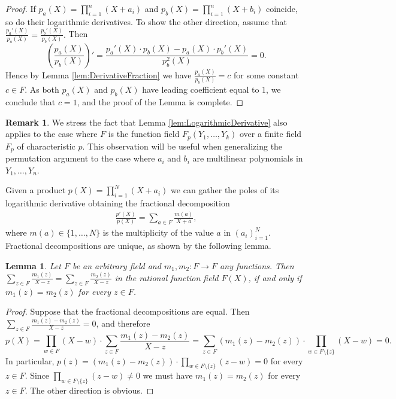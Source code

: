 \documentclass[11pt]{article}
\newtheorem{lem}[]{Lemma}
\theoremstyle{definition}
\theoremstyle{definition}
\newtheorem{rem}[thm]{Remark}
\begin{document}
\begin{proof}
If  $p_a(X) = \prod_{i=1}^n \left(X + a_i\right)$ and $p_b(X) = \prod_{i=1}^n \left(X + b_i\right)$
coincide, so do their logarithmic derivatives.
To show the other direction, assume that 
$
\frac{p_a'(X)}{p_a(X)}  = \frac{p_b'(X)}{p_b(X)}.
$
Then 
\[
\left(\frac{p_a(X)}{p_b(X)}\right)'  = \frac{p_a'(X)\cdot p_b(X) - p_a(X)\cdot  p_b'(X)} {p_b^2(X)} = 0.
\]
Hence by Lemma \ref{lem:DerivativeFraction} we have $\frac{p_a(X)}{p_b(X)} = c$ for some constant  $c \in F$.
As both $p_a(X)$ and $p_b(X)$ have leading coefficient equal to $1$, we conclude that $c =1$, and the proof of the Lemma is complete.
\end{proof}
\begin{rem}
\label{rem:LogarithmicDerivativeFunctionField}
We stress the fact that Lemma \ref{lem:LogarithmicDerivative} also applies to the case where $F$  is the function field $F_p(Y_1,\ldots, Y_k)$ over a finite field $F_p$ of characteristic $p$.
This observation will be useful when generalizing the permutation argument to the case where $a_i$ and $b_i$ are multilinear polynomials in $Y_1, \ldots, Y_n$.
\end{rem}

Given a product $p(X)=\prod_{i=1}^N (X + a_i)$ we can gather the poles of its logarithmic derivative obtaining the fractional decomposition  
\begin{align*}
\frac{p'(X)}{p(X)} = \sum_{a\in F} \frac{m(a)}{X + a},
\end{align*}
where $m(a)\in \{1,\ldots, N\}$ is the multiplicity of the value $a$ in $(a_i)_{i=1}^N$.
Fractional decompositions are unique, as shown by the following lemma.
\begin{lem}
\label{lem:UniqueFractionalRep}
Let $F$ be an arbitrary field and $m_1, m_2: F\rightarrow F$ any functions.
Then
$
\sum_{z\in F} \frac{m_1(z)}{X - z} = \sum_{z\in F} \frac{m_2(z)}{X - z}
$
in the rational function field $F(X)$, if and only if $m_1(z)=m_2(z)$ for every $z\in F$.
\end{lem}
\begin{proof}
Suppose that the fractional decompositions are equal.  
Then $\sum_{z\in F} \frac{m_1(z)-m_2(z)}{X - z} = 0$, and therefore
\[
p(X) = \prod_{w\in F} (X - w)\cdot\sum_{z\in F} \frac{m_1(z)-m_2(z)}{X - z} = \sum_{z\in F} (m_1(z)-m_2(z))\cdot \prod_{w\in F\setminus\{z\}} (X - w) = 0.
\]
In particular,
$
p(z) = (m_1(z) - m_2(z)) \cdot  \prod_{w\in F\setminus\{z\}} (z - w)= 0
$
for every $z\in F$.
Since   $\prod_{w\in F\setminus\{z\}} (z - w) \neq 0$ we must have $m_1(z)  = m_2(z)$ for every $z\in F$. 
The other direction is obvious.
\end{proof}
\end{document}
